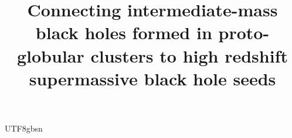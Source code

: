\documentclass[trackchanges, twocolappendix, twocolumn]{aastex701}
\begin{document}
\begin{CJK*}{UTF8}{gbsn}

\title{Connecting intermediate-mass black holes formed in proto-globular clusters to high redshift supermassive black hole seeds}



\end{CJK*}
\end{document}
